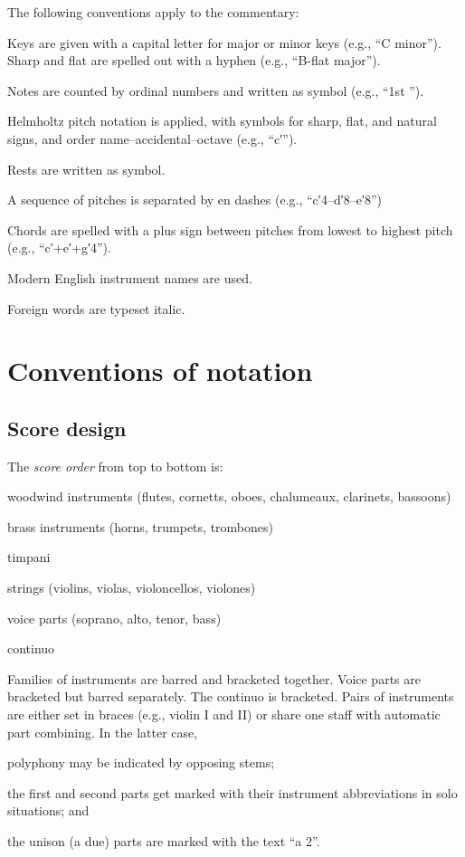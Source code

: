 \documentclass[abbrwidth=7em,shorttitlesize=55]{ees}
\begin{document}
The following conventions apply to the commentary:
\begin{bulletlist}
  \item Keys are given with a capital letter for major or minor keys (e.g., “C minor”). Sharp and flat are spelled out with a hyphen (e.g., “B-flat major”).
  \item Notes are counted by ordinal numbers and written as symbol (e.g., “1st \quarterNote”).
  \item Helmholtz pitch notation is applied, with symbols for sharp, flat, and natural signs, and order name–accidental–octave (e.g., “\sharp c′”).
  \item Rests are written as symbol.
  \item A sequence of pitches is separated by en dashes (e.g., “c′4–d′8–e′8”)
  \item Chords are spelled with a plus sign between pitches from lowest to highest pitch (e.g., “c′+e′+g′4”).
  \item Modern English instrument names are used.
  \item Foreign words are typeset italic.
\end{bulletlist}


\section*{Conventions of notation}

\subsection{Score design}

The \textit{score order} from top to bottom is:
\begin{bulletlist}
  \item woodwind instruments (flutes, cornetts, oboes, chalumeaux, clarinets, bassoons)
  \item brass instruments (horns, trumpets, trombones)
  \item timpani
  \item strings (violins, violas, violoncellos, violones)
  \item voice parts (soprano, alto, tenor, bass)
  \item continuo
\end{bulletlist}

Families of instruments are barred and bracketed together. Voice parts are bracketed but barred separately. The continuo is bracketed. Pairs of instruments are either set in braces (e.g., violin I and II) or share one staff with automatic part combining. In the latter case,
\begin{bulletlist}
  \item polyphony may be indicated by opposing stems;
  \item the first and second parts get marked with their instrument abbreviations in solo situations; and
  \item the unison (a due) parts are marked with the text “a 2”.
\end{bulletlist}
\end{document}
